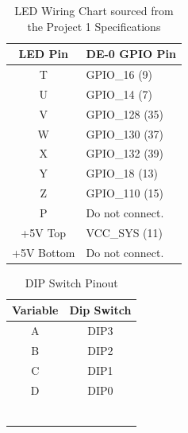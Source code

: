 \documentclass[12pt,letterpaper,titlepage]{article}
\begin{document}
\begin{raggedright}
\begin{paracol}{2}
\centering
\begin{table}[ht]
\centering
\def\arraystretch{1.5}
\begin{tabular}{|c|l|}\hline 
LED Pin & DE-0 GPIO Pin \\\hline 
T & GPIO\_16 (9) \\\hline 
U & GPIO\_14 (7) \\\hline 
V & GPIO\_128 (35) \\\hline 
W & GPIO\_130 (37) \\\hline 
X & GPIO\_132 (39) \\\hline 
Y &  GPIO\_18 (13) \\\hline 
Z & GPIO\_110 (15) \\\hline 
P & Do not connect. \\\hline 
+5V Top & VCC\_SYS (11) \\\hline 
+5V Bottom & Do not connect. \\\hline 
\end{tabular} 
\caption[LED Wiring Chart]{LED Wiring Chart sourced from the Project 1 Specifications}
\end{table}
\switchcolumn
\centering
\begin{table}[ht]
\centering
\def\arraystretch{1.5}
\begin{tabular}{|c|c|}\hline 
Variable & Dip Switch \\\hline 
A & DIP3 \\\hline  
B & DIP2 \\\hline  
C & DIP1 \\\hline  
D & DIP0 \\\hline 
  &      \\\hline 
  &      \\\hline 
  &      \\\hline 
  &      \\\hline 
  &      \\\hline 
  &      \\\hline 
\end{tabular} 
\caption{DIP Switch Pinout}
\end{table}
\end{paracol}
\end{raggedright}
\end{document}
